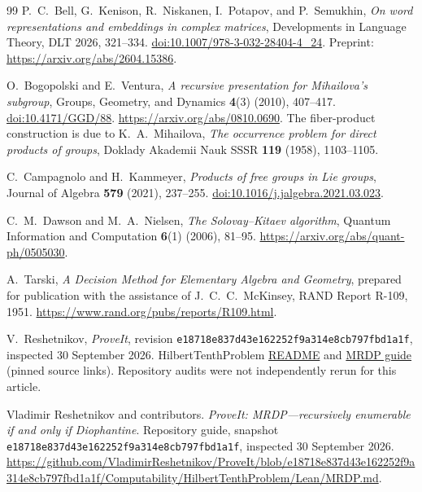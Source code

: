 \documentclass[11pt,letterpaper]{article}
\numberwithin{equation}{section}
\theoremstyle{definition}
\theoremstyle{remark}
\newcommand{\code}[1]{\nolinkurl{#1}}
\newcommand{\pin}{{\small\texttt{e18718e837d43e162252f9a314e8cb797fbd1a1f}}}
\begin{document}
\begin{thebibliography}{99}
P.~C.~Bell, G.~Kenison, R.~Niskanen, I.~Potapov, and P.~Semukhin,
\emph{On word representations and embeddings in complex matrices},
Developments in Language Theory, DLT 2026, 321--334.
\href{https://doi.org/10.1007/978-3-032-28404-4_24}{doi:10.1007/978-3-032-28404-4\_24}.
Preprint: \url{https://arxiv.org/abs/2604.15386}.

O.~Bogopolski and E.~Ventura,
\emph{A recursive presentation for Mihailova's subgroup},
Groups, Geometry, and Dynamics \textbf{4}(3) (2010), 407--417.
\href{https://doi.org/10.4171/GGD/88}{doi:10.4171/GGD/88}.
\url{https://arxiv.org/abs/0810.0690}.
The fiber-product construction is due to K.~A.~Mihailova,
\emph{The occurrence problem for direct products of groups},
Doklady Akademii Nauk SSSR \textbf{119} (1958), 1103--1105.

C.~Campagnolo and H.~Kammeyer,
\emph{Products of free groups in Lie groups},
Journal of Algebra \textbf{579} (2021), 237--255.
\href{https://doi.org/10.1016/j.jalgebra.2021.03.023}{doi:10.1016/j.jalgebra.2021.03.023}.

C.~M.~Dawson and M.~A.~Nielsen,
\emph{The Solovay--Kitaev algorithm},
Quantum Information and Computation \textbf{6}(1) (2006), 81--95.
\url{https://arxiv.org/abs/quant-ph/0505030}.

A.~Tarski,
\emph{A Decision Method for Elementary Algebra and Geometry},
prepared for publication with the assistance of J.~C.~C.~McKinsey,
RAND Report R-109, 1951.
\url{https://www.rand.org/pubs/reports/R109.html}.

V.~Reshetnikov, \emph{ProveIt}, revision
\code{e18718e837d43e162252f9a314e8cb797fbd1a1f}, inspected 30 September 2026.
HilbertTenthProblem
\href{https://github.com/VladimirReshetnikov/ProveIt/blob/e18718e837d43e162252f9a314e8cb797fbd1a1f/Computability/HilbertTenthProblem/README.md}{README}
and
\href{https://github.com/VladimirReshetnikov/ProveIt/blob/e18718e837d43e162252f9a314e8cb797fbd1a1f/Computability/HilbertTenthProblem/Lean/MRDP.md}{MRDP guide}
(pinned source links).
Repository audits were not independently rerun for this article.

Vladimir Reshetnikov and contributors.
\emph{ProveIt: MRDP---recursively enumerable if and only if Diophantine}.
Repository guide, snapshot \pin, inspected 30 September 2026.
\url{https://github.com/VladimirReshetnikov/ProveIt/blob/e18718e837d43e162252f9a314e8cb797fbd1a1f/Computability/HilbertTenthProblem/Lean/MRDP.md}.


\end{thebibliography}
\end{document}
